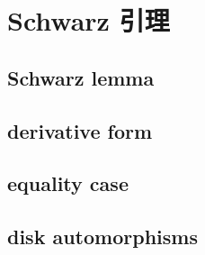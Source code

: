 \section{Schwarz 引理}
\label{b3:sec:0601}


\subsection{Schwarz lemma}
\label{b3:subsec:060101}

\subsection{derivative form}
\label{b3:subsec:060102}

\subsection{equality case}
\label{b3:subsec:060103}

\subsection{disk automorphisms}
\label{b3:subsec:060104}


